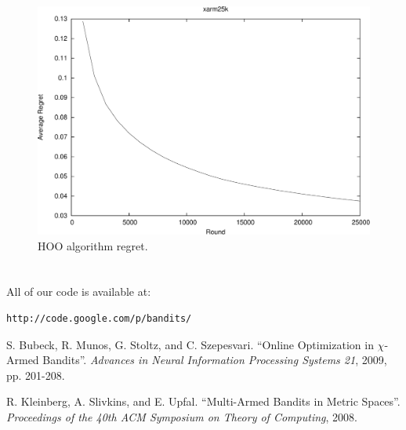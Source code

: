 \documentclass{article}
\begin{document}
\begin{figure}[h!]
  \begin{center}
     \includegraphics[width=\figwidth]{images/xarm25k-crop.pdf}
     \caption{HOO algorithm regret.}
     \label{fig:hoo}
  \end{center}
\end{figure}


\clearpage
\section*{}

All of our code is available at:
\begin{verbatim}
http://code.google.com/p/bandits/
\end{verbatim}



\begin{thebibliography}{99}

S. Bubeck, R. Munos, G. Stoltz, and C. Szepesvari.
``Online Optimization in $\chi$-Armed Bandits''.
\emph{Advances in Neural Information Processing Systems 21}, 2009, pp. 201-208.

R. Kleinberg, A. Slivkins, and E. Upfal.
``Multi-Armed Bandits in Metric Spaces''.
\emph{Proceedings of the 40th ACM Symposium on Theory of Computing}, 2008.

\end{thebibliography}
\end{document}
